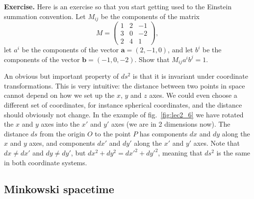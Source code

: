 \documentclass[11pt, a4paper,oneside,openright]{book}
\numberwithin{equation}{section}
\begin{document}
\par\vspace{\baselineskip}

{\bf Exercise.} Here is an exercise so that you start getting used to the Einstein summation convention. Let $M_{ij}$ be the components of the matrix
\begin{equation}
M=\left( \begin{array}{ccc} 1 & 2 & -1 \\ 
3 & 0 & -2 \\
2 & 4 & 1 \end{array} \right),
\end{equation}
let $a^i$ be the components of the vector $\mathbf{a}=(2,-1,0)$, and let $b^i$ be the components of the vector $\mathbf{b}=(-1,0,-2)$. Show that $M_{ij}a^ib^j=1$.

\par\vspace{\baselineskip}

An obvious but important property of $ds^2$ is that it is invariant under coordinate transformations. This is very intuitive: the distance between two points in space cannot depend on how we set up the $x$, $y$ and $z$ axes. We could even choose a different set of coordinates, for instance spherical coordinates, and the distance should obviously not change. In the example of fig.\ \ref{fig:lec2_6} we have rotated the $x$ and $y$ axes into the $x'$ and $y'$ axes (we are in 2 dimensions now). The distance $ds$ from the origin $O$ to the point $P$ has components $dx$ and $dy$ along the $x$ and $y$ axes, and components $dx'$ and $dy'$ along the $x'$ and $y'$ axes. Note that $dx\neq dx'$ and $dy\neq dy'$, but $dx^2+dy^2=dx'^2+dy'^2$, meaning that $ds^2$ is the same in both coordinate systems.

\subsection{Minkowski spacetime}
\end{document}
